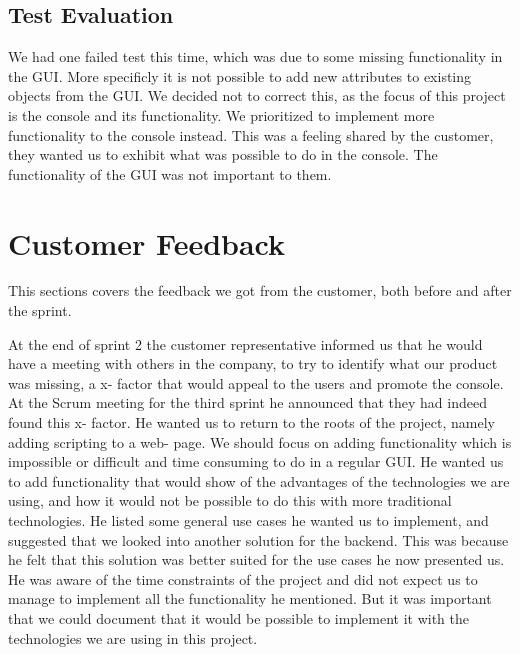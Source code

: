 \subsection{Test Evaluation}
We had one failed test this time, which was due to some missing functionality in the GUI. More specificly it is not possible to add new attributes to existing objects from the GUI. We decided not to correct this, as the focus of this project is the console and its functionality. We prioritized to implement more functionality to the console instead. This was a feeling shared by the customer, they wanted us to exhibit what was possible to do in the console. The functionality of the GUI was not important to them.

\section{Customer Feedback}
This sections covers the feedback we got from the customer, both before and after the sprint.


At the end of sprint 2 the customer representative informed us that he would have a meeting with others in the company, to try to identify what our product was missing, a x- factor that would appeal to the users and promote the console. At the Scrum meeting for the third sprint he announced that they had indeed found this x- factor. He wanted us to return to the roots of the project, namely adding scripting to a web- page. We should focus on adding functionality which is impossible or difficult and time consuming to do in a regular GUI. He wanted us to add functionality that would show of the advantages of the technologies we are using, and how it would not be possible to do this with more traditional technologies. He listed some general use cases he wanted us to implement, and suggested that we looked into another solution for the backend. This was because he felt that this solution was better suited for the use cases he now presented us. He was aware of the time constraints of the project and did not expect us to manage to implement all the functionality he mentioned. But it was important that we could document that it would be possible to implement it with the technologies we are using in this project.


